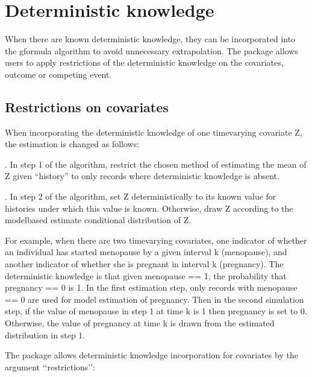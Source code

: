 \documentclass[letterpaper,10pt,english]{sphinxmanual}
\begin{document}
\section{Deterministic knowledge}
\label{\detokenize{Specifications/Deterministic knowledge:deterministic-knowledge}}\label{\detokenize{Specifications/Deterministic knowledge:id1}}\label{\detokenize{Specifications/Deterministic knowledge::doc}}
\sphinxAtStartPar
When there are known deterministic knowledge, they can be incorporated into the g\sphinxhyphen{}formula algorithm to avoid unnecessary
extrapolation. The package allows users to apply restrictions of the deterministic knowledge on the covariates,
outcome or competing event.


\subsection{Restrictions on covariates}
\label{\detokenize{Specifications/Deterministic knowledge:restrictions-on-covariates}}
\sphinxAtStartPar
When incorporating the deterministic knowledge of one time\sphinxhyphen{}varying covariate Z, the estimation is changed as follows:

. In step 1 of the algorithm, restrict the chosen method of estimating the mean of Z given
“history” to only records where deterministic knowledge is absent.

. In step 2 of the algorithm, set Z deterministically to its known value for histories under which this
value is known. Otherwise, draw Z according to the model\sphinxhyphen{}based estimate conditional distribution of Z.

\sphinxAtStartPar
For example, when there are two time\sphinxhyphen{}varying covariates, one indicator of whether an individual has started menopause
by a given interval k (menopause), and another indicator of whether she is pregnant in interval k (pregnancy).
The deterministic knowledge is that given menopause == 1, the probability that pregnancy == 0 is 1. In the first
estimation step, only records with menopause == 0 are used for model estimation of pregnancy. Then in the second
simulation step, if the value of menopause in step 1 at time k is 1 then pregnancy is set to 0. Otherwise, the value
of pregnancy at time k is drawn from the estimated distribution in step 1.

\sphinxAtStartPar
The package allows deterministic knowledge incorporation for covariates by the argument ‘‘restrictions’’:
\end{document}
